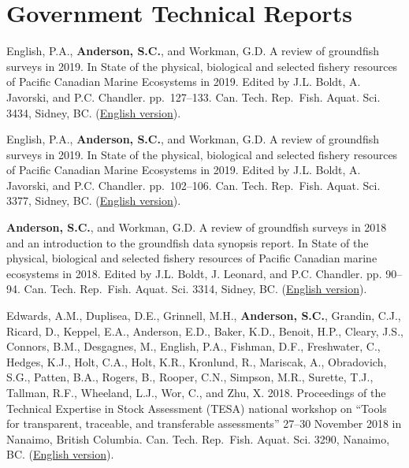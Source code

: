\hypertarget{government-technical-reports}{%
\section{Government Technical
Reports}\label{government-technical-reports}}

\begin{description}
\tightlist
\item[2021]
English, P.A., \textbf{Anderson, S.C.}, and Workman, G.D. A review of
groundfish surveys in 2019. In State of the physical, biological and
selected fishery resources of Pacific Canadian Marine Ecosystems in
2019. Edited by J.L. Boldt, A. Javorski, and P.C. Chandler.
pp.\ 127--133. Can. Tech. Rep.\ Fish. Aquat. Sci. 3434, Sidney, BC.
(\href{https://publications.gc.ca/site/eng/9.900827/publication.html}{English
version}).
\item[2020]
English, P.A., \textbf{Anderson, S.C.}, and Workman, G.D. A review of
groundfish surveys in 2019. In State of the physical, biological and
selected fishery resources of Pacific Canadian Marine Ecosystems in
2019. Edited by J.L. Boldt, A. Javorski, and P.C. Chandler.
pp.\ 102--106. Can. Tech. Rep.\ Fish. Aquat. Sci. 3377, Sidney, BC.
(\href{https://www.dfo-mpo.gc.ca/oceans/publications/soto-rceo/2019/index-eng.html}{English
version}).
\item[2019]
\textbf{Anderson, S.C.}, and Workman, G.D. A review of groundfish
surveys in 2018 and an introduction to the groundfish data synopsis
report. In State of the physical, biological and selected fishery
resources of Pacific Canadian marine ecosystems in 2018. Edited by J.L.
Boldt, J. Leonard, and P.C. Chandler. pp. 90--94. Can. Tech. Rep.\ Fish.
Aquat. Sci. 3314, Sidney, BC.
(\href{https://www.dfo-mpo.gc.ca/oceans/publications/soto-rceo/2018/index-eng.html}{English
version}).
\item[2018]
Edwards, A.M., Duplisea, D.E., Grinnell, M.H., \textbf{Anderson, S.C.},
Grandin, C.J., Ricard, D., Keppel, E.A., Anderson, E.D., Baker, K.D.,
Benoit, H.P., Cleary, J.S., Connors, B.M., Desgagnes, M., English, P.A.,
Fishman, D.F., Freshwater, C., Hedges, K.J., Holt, C.A., Holt, K.R.,
Kronlund, R., Mariscak, A., Obradovich, S.G., Patten, B.A., Rogers, B.,
Rooper, C.N., Simpson, M.R., Surette, T.J., Tallman, R.F., Wheeland,
L.J., Wor, C., and Zhu, X. 2018. Proceedings of the Technical Expertise
in Stock Assessment (TESA) national workshop on ``Tools for transparent,
traceable, and transferable assessments'' 27--30 November 2018 in
Nanaimo, British Columbia. Can. Tech. Rep.\ Fish. Aquat. Sci. 3290,
Nanaimo, BC.
(\href{https://waves-vagues.dfo-mpo.gc.ca/Library/40750152.pdf}{English
version}).
\end{description}


